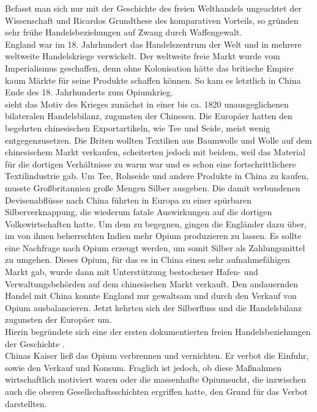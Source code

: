 %
Befasst man sich nur mit der Geschichte des freien Welthandels ungeachtet der Wissenschaft und Ricardos Grundthese des komparativen Vorteils, so gründen sehr frühe Handelsbeziehungen auf Zwang durch Waffengewalt. \\
%
 England war im 18. Jahrhundert das Handelszentrum der Welt und in mehrere weltweite Handelskriege verwickelt. Der weltweite freie Markt wurde vom Imperialismus geschaffen, denn ohne Kolonisation hätte das britische Empire kaum Märkte für seine Produkte schaffen können. So kam es letztlich in China Ende des 18. Jahrhunderts zum Opiumkrieg. \\
%
 \cite{Straubhaar.2011} sieht das Motiv des Krieges zunächst in einer bis ca. 1820 unausgeglichenen bilateralen Handelsbilanz, zugunsten der Chinesen. Die Europäer hatten den begehrten chinesischen Exportartikeln, wie Tee und Seide, meist wenig entgegenzusetzen. Die Briten wollten Textilien aus Baumwolle und Wolle auf dem chinesischem Markt verkaufen, scheiterten jedoch mit beidem, weil das Material für die dortigen Verhältnisse zu warm war und es schon eine fortschrittlichere Textilindustrie gab. Um Tee, Rohseide und andere Produkte in China zu kaufen, musste Großbritannien große Mengen Silber ausgeben. Die damit verbundenen Devisenabflüsse nach China führten in Europa zu einer spürbaren Silberverknappung, die wiederum fatale Auswirkungen auf die dortigen Volkswirtschaften hatte. Um dem zu begegnen, gingen die Engländer dazu über, im von ihnen beherrschten Indien mehr Opium produzieren zu lassen. Es sollte eine Nachfrage nach Opium erzeugt werden, um somit Silber als Zahlungsmittel zu umgehen.  Dieses Opium, für das es in China einen sehr aufnahmefähigen Markt gab, wurde dann mit Unterstützung bestochener Hafen- und Verwaltungsbehörden auf dem chinesischen Markt verkauft. Den andauernden Handel mit China konnte England nur gewaltsam und durch den Verkauf von Opium ausbalancieren. Jetzt kehrten sich der {\dq}Silberfluss{\dq} und die Handelsbilanz zugunsten der Europäer um.\\
%
 Hierin begründete sich eine der ersten dokumentierten {\dq}freien{\dq} Handelsbeziehungen der Geschichte \cite[S.2]{Straubhaar.2011}.\\
%
 Chinas Kaiser ließ das Opium verbrennen und vernichten. Er verbot die Einfuhr, sowie den Verkauf und Konsum. Fraglich ist jedoch, ob diese Maßnahmen wirtschaftlich motiviert waren oder die massenhafte Opiumsucht, die inzwischen auch die oberen Gesellschaftsschichten ergriffen hatte, den Grund für das Verbot darstellten. \\
